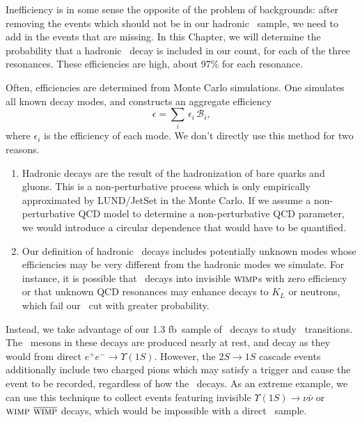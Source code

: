 \documentclass{cornell}
\begin{document}
Inefficiency is in some sense the opposite of the problem of
backgrounds: after removing the events which should not be in our
hadronic \ups\ sample, we need to add in the events that are missing.
In this Chapter, we will determine the probability that a hadronic
\ups\ decay is included in our count, for each of the three
resonances.  These efficiencies are high, about 97\% for each
resonance.

Often, efficiencies are determined from Monte Carlo simulations.  One
simulates all known decay modes, and constructs an aggregate efficiency
\begin{equation}
  \epsilon = \sum_i \, \epsilon_i \, {\mathcal B}_i \mbox{,}
  \label{eqn:agregate}
\end{equation}
where $\epsilon_i$ is the efficiency of each mode.  We don't directly
use this method for two reasons.
\begin{enumerate}

  \item Hadronic decays are the result of the hadronization of bare
    quarks and gluons.  This is a non-perturbative process which is
    only empirically approximated by LUND/JetSet in the Monte Carlo.
    If we assume a non-perturbative QCD model to determine a
    non-perturbative QCD parameter, we would introduce a circular
    dependence that would have to be quantified.

  \item Our definition of hadronic \ups\ decays includes potentially
    unknown modes whose efficiencies may be very different from the
    hadronic modes we simulate.  For instance, it is possible that
    \ups\ decays into invisible $\mbox{\sc wimp}$s with zero
    efficiency or that unknown QCD resonances may enhance decays to
    $K_L$ or neutrons, which fail our \visen\ cut with greater
    probability.

\end{enumerate}

Instead, we take advantage of our 1.3 fb\inv\ sample of \uss\ decays
to study \twotoone\ transitions.  The \us\ mesons in these decays are
produced nearly at rest, and decay as they would from direct $e^+e^-
\to \Upsilon(1S)$.  However, the $2S \to 1S$ cascade events
additionally include two charged pions which may satisfy a trigger and
cause the event to be recorded, regardless of how the \us\ decays.  As
an extreme example, we can use this technique to collect events
featuring invisible $\Upsilon(1S) \to \nu\bar{\nu}$ or $\mbox{\sc wimp
} \overline{\mbox{\sc wimp}}$ decays, which would be impossible with a
direct \us\ sample.
\end{document}
